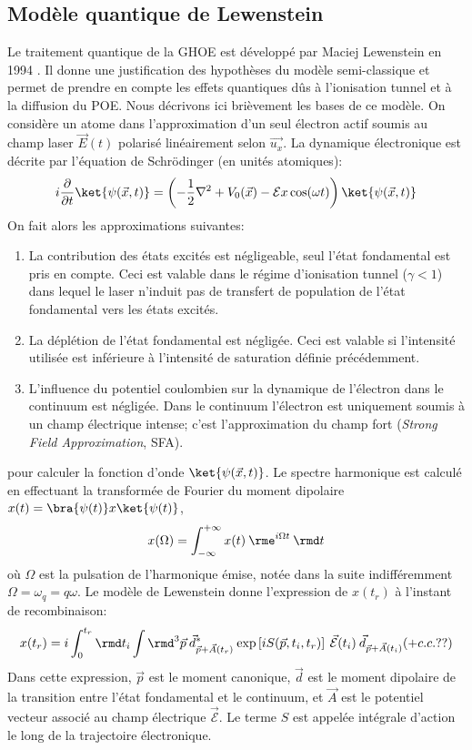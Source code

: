 \subsection{Modèle quantique de Lewenstein}
Le traitement quantique de la GHOE est développé par Maciej Lewenstein en 1994 . Il donne une justification des hypothèses du modèle semi-classique et permet de prendre en compte les effets quantiques dûs à l'ionisation tunnel et à la diffusion du POE. Nous décrivons ici brièvement les bases de ce modèle. On considère un atome dans l'approximation d'un seul électron actif soumis au champ laser $\vec{E}(t)$ polarisé linéairement selon $\vec{u_x}$. La dynamique électronique est décrite par l'équation de Schrödinger (en unités atomiques):
\begin{equation}
i \frac{\partial}{\partial t} \ket{\psi(\vec{x},t)} = \left( -\frac{1}{2}\nabla^2 + V_0(\vec{x}) - \mathcal{E} x \cos(\omega t) \right) \ket{\psi(\vec{x},t)}
\end{equation} 
On fait alors les approximations suivantes:
\begin{enumerate}
\item La contribution des états excités est négligeable, seul l'état fondamental est pris en compte. Ceci est valable dans le régime d'ionisation tunnel ($\gamma <1$) dans lequel le laser n'induit pas de transfert de population de l'état fondamental vers les états excités.
\item La déplétion de l'état fondamental est négligée. Ceci est valable si l'intensité utilisée est inférieure à l'intensité de saturation définie précédemment.
\item L'influence du potentiel coulombien sur la dynamique de l'électron dans le continuum est négligée. Dans le continuum l'électron est uniquement soumis à un champ électrique intense; c'est l'approximation du champ fort (\textit{Strong Field Approximation}, SFA).
\end{enumerate}
pour calculer la fonction d'onde $\ket{\psi(\vec{x},t)}$. Le spectre harmonique est calculé en effectuant la transformée de Fourier du moment dipolaire $x(t) =\bra{\psi(t)} x \ket{\psi(t)}$,
\begin{equation}
x(\Omega) = \int_{-\infty}^{+\infty} x(t) \: \rme^{i \Omega t}  \: \rmd t
\end{equation}
où $\Omega$ est la pulsation de l'harmonique émise, notée dans la suite indifféremment $\Omega = \omega_q = q \omega$. Le modèle de Lewenstein donne l'expression de $x(t_r)$ à l'instant de recombinaison:
\begin{equation}
x(t_r) = i \int_0^{t_r} \rmd t_i \int \rmd^3 \vec{p} \: \vec{d}^*_{\vec{p}+\vec{A}(t_r)} \: \text{exp}\left[i S(\vec{p}, t_i, t_r) \right] \: \vec{\mathcal{E}}(t_i) \: \vec{d}_{\vec{p}+\vec{A}(t_i)} (+ c.c. ??)
\label{eq:x_Lew}
\end{equation}
Dans cette expression, $\vec{p}$ est le moment canonique, $\vec{d}$ est le moment dipolaire de la transition entre l'état fondamental et le continuum, et $\vec{A}$ est le potentiel vecteur associé au champ électrique $\vec{\mathcal{E}}$. Le terme $S$ est appelée intégrale d'action le long de la trajectoire électronique. 

